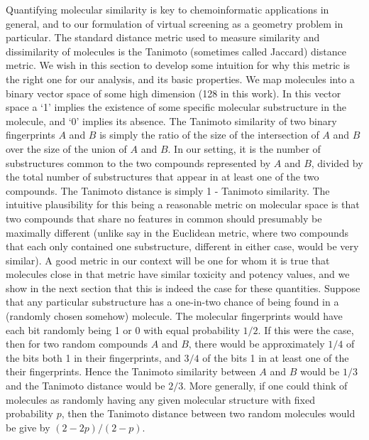 \documentclass{article}
\begin{document}
Quantifying molecular similarity is key to chemoinformatic applications in general\cite{Bender2004b}, and to our formulation of virtual screening as a geometry problem in particular.
The standard distance metric used to measure similarity and dissimilarity of molecules is the Tanimoto (sometimes called Jaccard) distance metric\cite{Bajusz2015}.  We wish in this section to develop some intuition for why this metric is the right one for our analysis, and its basic properties.
We map molecules into a binary vector space of some high dimension (128 in this work). In this vector space a `1' implies the existence of some specific molecular substructure in the molecule, and `0' implies its absence.  \newline
\newline
The Tanimoto similarity of two binary fingerprints $A$ and $B$ is simply the ratio of the size of the intersection of $A$ and $B$ over the size of the union of $A$ and $B$\cite{Bajusz2015}. In our setting, it is the number of substructures common to the two compounds represented by $A$ and $B$, divided by the total number of substructures that appear in at least one of the two compounds. The Tanimoto distance is simply 1 - Tanimoto similarity.  The intuitive plausibility for this being a reasonable metric on molecular space is that two compounds that share no features in common should presumably be maximally different (unlike say in the Euclidean metric, where two compounds that each only contained one substructure, different in either case, would be very similar).
\newline
\newline
A good metric in our context will be one for whom it is true that molecules close in that metric have similar toxicity and potency values, and we show in the next section that this is indeed the case for these quantities.
Suppose that any particular substructure has a one-in-two chance of being found in a (randomly chosen somehow) molecule.  The molecular fingerprints would have each bit randomly being 1 or 0 with equal probability $1/2$.  If this were the case, then for two random compounds $A$ and $B$, there would be approximately $1/4$ of the bits both 1 in their fingerprints, and $3/4$ of the bits 1 in at least one of the their fingerprints.  Hence the Tanimoto similarity between $A$ and $B$ would be $1/3$ and the Tanimoto distance would be $2/3$.  More generally, if one could think of molecules as randomly having any given molecular structure with fixed probability $p$, then the Tanimoto distance between two random molecules would be give by $(2-2p)/(2 - p)$.
\end{document}
